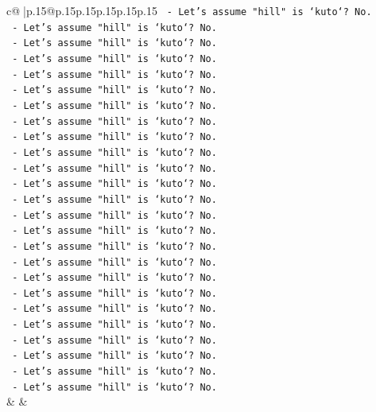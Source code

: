 \documentclass{article}
\begin{document}
{\begin{supertabular}{c@{$\;$}|p{.15\linewidth}@{}p{.15\linewidth}p{.15\linewidth}p{.15\linewidth}p{.15\linewidth}p{.15\linewidth}}
{{{\texttt{                {-} Let's assume "hill" is `kuto`? No.} \\
\texttt{                {-} Let's assume "hill" is `kuto`? No.} \\
\texttt{                {-} Let's assume "hill" is `kuto`? No.} \\
\texttt{                {-} Let's assume "hill" is `kuto`? No.} \\
\texttt{                {-} Let's assume "hill" is `kuto`? No.} \\
\texttt{                {-} Let's assume "hill" is `kuto`? No.} \\
\texttt{                {-} Let's assume "hill" is `kuto`? No.} \\
\texttt{                {-} Let's assume "hill" is `kuto`? No.} \\
\texttt{                {-} Let's assume "hill" is `kuto`? No.} \\
\texttt{                {-} Let's assume "hill" is `kuto`? No.} \\
\texttt{                {-} Let's assume "hill" is `kuto`? No.} \\
\texttt{                {-} Let's assume "hill" is `kuto`? No.} \\
\texttt{                {-} Let's assume "hill" is `kuto`? No.} \\
\texttt{                {-} Let's assume "hill" is `kuto`? No.} \\
\texttt{                {-} Let's assume "hill" is `kuto`? No.} \\
\texttt{                {-} Let's assume "hill" is `kuto`? No.} \\
\texttt{                {-} Let's assume "hill" is `kuto`? No.} \\
\texttt{                {-} Let's assume "hill" is `kuto`? No.} \\
\texttt{                {-} Let's assume "hill" is `kuto`? No.} \\
\texttt{                {-} Let's assume "hill" is `kuto`? No.} \\
\texttt{                {-} Let's assume "hill" is `kuto`? No.} \\
\texttt{                {-} Let's assume "hill" is `kuto`? No.} \\
\texttt{                {-} Let's assume "hill" is `kuto`? No.} \\
\texttt{                {-} Let's assume "hill" is `kuto`? No.} \\
\texttt{                {-} Let's assume "hill" is `kuto`? No.} \\
            }
        }
    }
    & & \\ \\


\end{supertabular}}
\end{document}
